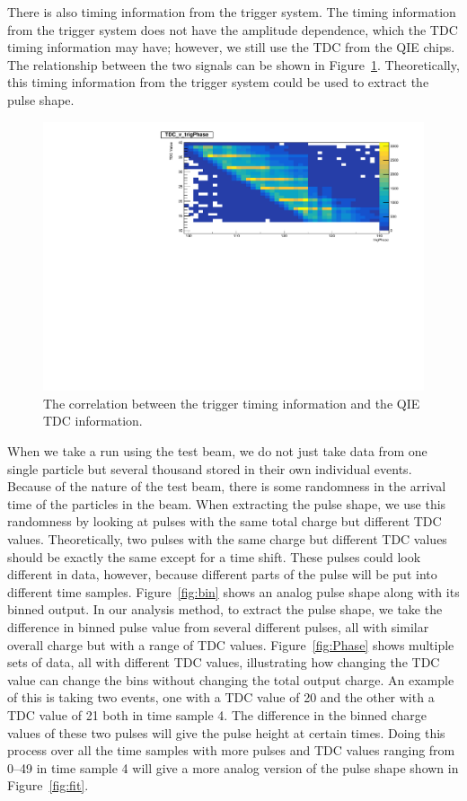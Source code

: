 There is also timing information from the trigger system. The timing information from the trigger system does not have the amplitude dependence, which the TDC timing information may have; however, we still use the TDC from the QIE chips. The relationship between the two signals can be shown in Figure~\ref{fig:tdc}. Theoretically, this timing information from the trigger system could be used to extract the pulse shape.

\begin{figure}
\centering
\includegraphics[width=\linewidth]{Figures/TDCvTrigPhase.pdf}
\caption{The correlation between the trigger timing information and the QIE TDC information.}
\label{fig:tdc}
\end{figure}

When we take a run using the test beam, we do not just take data from one single particle but several thousand stored in their own individual events. Because of the nature of the test beam, there is some randomness in the arrival time of the particles in the beam. When extracting the pulse shape, we use this randomness by looking at pulses with the same total charge but different TDC values. Theoretically, two pulses with the same charge but different TDC values should be exactly the same except for a time shift. These pulses could look different in data, however, because different parts of the pulse will be put into different time samples. Figure~\ref{fig:bin} shows an analog pulse shape along with its binned output. In our analysis method, to extract the pulse shape, we take the difference in binned pulse value from several different pulses, all with similar overall charge but with a range of TDC values. Figure~\ref{fig:Phase} shows multiple sets of data, all with different TDC values, illustrating how changing the TDC value can change the bins without changing the total output charge. An example of this is taking two events, one with a TDC value of 20 and the other with a TDC value of 21 both in time sample 4. The difference in the binned charge values of these two pulses will give the pulse height at certain times. Doing this process over all the time samples with more pulses and TDC values ranging from 0--49 in time sample 4 will give a more analog version of the pulse shape shown in Figure~\ref{fig:fit}.

